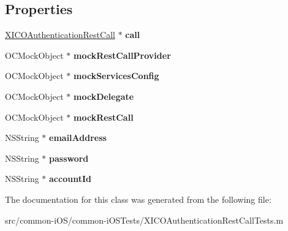 \subsection*{Properties}
\begin{DoxyCompactItemize}
\item 
\hypertarget{interface_x_i_c_o_authentication_rest_call_tests_a563e7ef986aa56e3e789b48a9fa53c2b}{}\label{interface_x_i_c_o_authentication_rest_call_tests_a563e7ef986aa56e3e789b48a9fa53c2b} 
\hyperlink{interface_x_i_c_o_authentication_rest_call}{X\+I\+C\+O\+Authentication\+Rest\+Call} $\ast$ {\bfseries call}
\item 
\hypertarget{interface_x_i_c_o_authentication_rest_call_tests_a6496c5b56dd476691222351e612b68c7}{}\label{interface_x_i_c_o_authentication_rest_call_tests_a6496c5b56dd476691222351e612b68c7} 
O\+C\+Mock\+Object $\ast$ {\bfseries mock\+Rest\+Call\+Provider}
\item 
\hypertarget{interface_x_i_c_o_authentication_rest_call_tests_ac7c2ce6fa6d427e92f367db267226ccd}{}\label{interface_x_i_c_o_authentication_rest_call_tests_ac7c2ce6fa6d427e92f367db267226ccd} 
O\+C\+Mock\+Object $\ast$ {\bfseries mock\+Services\+Config}
\item 
\hypertarget{interface_x_i_c_o_authentication_rest_call_tests_a27bbec03fe813beb70b861c482d4dd47}{}\label{interface_x_i_c_o_authentication_rest_call_tests_a27bbec03fe813beb70b861c482d4dd47} 
O\+C\+Mock\+Object $\ast$ {\bfseries mock\+Delegate}
\item 
\hypertarget{interface_x_i_c_o_authentication_rest_call_tests_afa9318aec8415f175ac5429b9bb93c74}{}\label{interface_x_i_c_o_authentication_rest_call_tests_afa9318aec8415f175ac5429b9bb93c74} 
O\+C\+Mock\+Object $\ast$ {\bfseries mock\+Rest\+Call}
\item 
\hypertarget{interface_x_i_c_o_authentication_rest_call_tests_a68aef070ea0f8790b4a0d8c5b52adf87}{}\label{interface_x_i_c_o_authentication_rest_call_tests_a68aef070ea0f8790b4a0d8c5b52adf87} 
N\+S\+String $\ast$ {\bfseries email\+Address}
\item 
\hypertarget{interface_x_i_c_o_authentication_rest_call_tests_adc384a29e7c888630bd31c7fdc7e41af}{}\label{interface_x_i_c_o_authentication_rest_call_tests_adc384a29e7c888630bd31c7fdc7e41af} 
N\+S\+String $\ast$ {\bfseries password}
\item 
\hypertarget{interface_x_i_c_o_authentication_rest_call_tests_a133ccd6a9a91b366d6ea497e67316dda}{}\label{interface_x_i_c_o_authentication_rest_call_tests_a133ccd6a9a91b366d6ea497e67316dda} 
N\+S\+String $\ast$ {\bfseries account\+Id}
\end{DoxyCompactItemize}


The documentation for this class was generated from the following file\+:\begin{DoxyCompactItemize}
\item 
src/common-\/i\+O\+S/common-\/i\+O\+S\+Tests/X\+I\+C\+O\+Authentication\+Rest\+Call\+Tests.\+m\end{DoxyCompactItemize}
